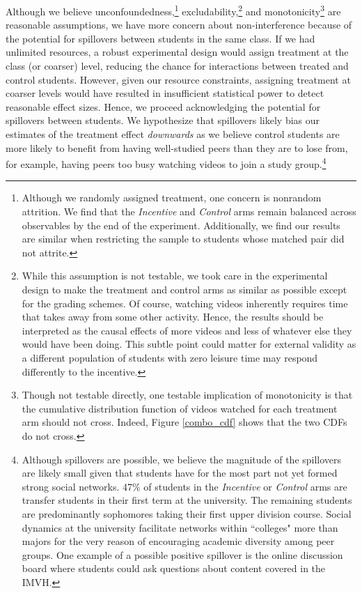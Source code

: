 \documentclass[12pt]{article}
\begin{document}
Although we believe unconfoundedness,\footnote{Although we randomly assigned treatment, one concern is nonrandom attrition. We find that the \textit{Incentive} and \textit{Control} arms remain balanced across observables by the end of the experiment. Additionally, we find our results are similar when restricting the sample to students whose matched pair did not attrite.} excludability,\footnote{While this assumption is not testable, we took care in the experimental design to make the treatment and control arms as similar as possible except for the grading schemes. Of course, watching videos inherently requires time that takes away from some other activity. Hence, the results should be interpreted as the causal effects of more videos and less of whatever else they would have been doing. This subtle point could matter for external validity as a different population of students with zero leisure time may respond differently to the incentive.} and monotonicity\footnote{Though not testable directly, one testable implication of monotonicity is that the cumulative distribution function of videos watched for each treatment arm should not cross. Indeed, Figure \ref{combo_cdf} shows that the two CDFs do not cross.} are reasonable assumptions, we have more concern about non-interference because of the potential for spillovers between students in the same class. If we had unlimited resources, a robust experimental design would assign treatment at the class (or coarser) level, reducing the chance for interactions between treated and control students. However, given our resource constraints, assigning treatment at coarser levels would have resulted in insufficient statistical power to detect reasonable effect sizes. Hence, we proceed acknowledging the potential for spillovers between students. We hypothesize that spillovers likely bias our estimates of the treatment effect \textit{downwards} as we believe control students are more likely to benefit from having well-studied peers than they are to lose from, for example, having peers too busy watching videos to join a study group.\footnote{Although spillovers are possible, we believe the magnitude of the spillovers are likely small given that students have for the most part not yet formed strong social networks. 47\% of students in the \textit{Incentive} or \textit{Control} arms are transfer students in their first term at the university. The remaining students are predominantly sophomores taking their first upper division course. Social dynamics at the university facilitate networks within ``colleges" more than majors for the very reason of encouraging academic diversity among peer groups. One example of a possible positive spillover is the online discussion board where students could ask questions about content covered in the IMVH.}
\end{document}
